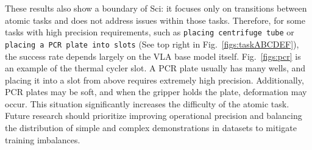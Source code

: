\documentclass[letterpaper]{article} %
\begin{document}
These results also show a boundary of Sci: it focuses only on transitions between atomic tasks and does not address issues within those tasks. Therefore, for some tasks with high precision requirements, such as \texttt{placing centrifuge tube} or \texttt{placing a PCR plate into slots} (See top right in Fig.~\ref{figs:taskABCDEF}), the success rate depends largely on the VLA base model itself. Fig.~\ref{figs:pcr} is an example of the thermal cycler slot. A PCR plate usually has many wells, and placing it into a slot from above requires extremely high precision.
Additionally, PCR plates may be soft, and when the gripper holds the plate, deformation may occur. This situation significantly increases the difficulty of the atomic task.
Future research should prioritize improving operational precision and balancing the distribution of simple and complex demonstrations in datasets to mitigate training imbalances.
\end{document}
